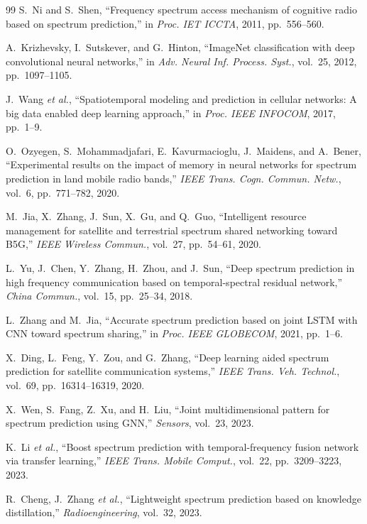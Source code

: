 \documentclass[lettersize,journal]{IEEEtran}
\begin{document}
\begin{thebibliography}{99}
 S.~Ni and S.~Shen, ``Frequency spectrum access mechanism of cognitive radio based on spectrum prediction,'' in \emph{Proc. IET ICCTA}, 2011, pp.~556--560.

 A.~Krizhevsky, I.~Sutskever, and G.~Hinton, ``ImageNet classification with deep convolutional neural networks,'' in \emph{Adv. Neural Inf. Process. Syst.}, vol.~25, 2012, pp.~1097--1105.

 J.~Wang \emph{et al.}, ``Spatiotemporal modeling and prediction in cellular networks: A big data enabled deep learning approach,'' in \emph{Proc. IEEE INFOCOM}, 2017, pp.~1--9.

 O.~Ozyegen, S.~Mohammadjafari, E.~Kavurmacioglu, J.~Maidens, and A.~Bener, ``Experimental results on the impact of memory in neural networks for spectrum prediction in land mobile radio bands,'' \emph{IEEE Trans. Cogn. Commun. Netw.}, vol.~6, pp.~771--782, 2020.

 M.~Jia, X.~Zhang, J.~Sun, X.~Gu, and Q.~Guo, ``Intelligent resource management for satellite and terrestrial spectrum shared networking toward B5G,'' \emph{IEEE Wireless Commun.}, vol.~27, pp.~54--61, 2020.

 L.~Yu, J.~Chen, Y.~Zhang, H.~Zhou, and J.~Sun, ``Deep spectrum prediction in high frequency communication based on temporal-spectral residual network,'' \emph{China Commun.}, vol.~15, pp.~25--34, 2018.

 L.~Zhang and M.~Jia, ``Accurate spectrum prediction based on joint LSTM with CNN toward spectrum sharing,'' in \emph{Proc. IEEE GLOBECOM}, 2021, pp.~1--6.

 X.~Ding, L.~Feng, Y.~Zou, and G.~Zhang, ``Deep learning aided spectrum prediction for satellite communication systems,'' \emph{IEEE Trans. Veh. Technol.}, vol.~69, pp.~16314--16319, 2020.

 X.~Wen, S.~Fang, Z.~Xu, and H.~Liu, ``Joint multidimensional pattern for spectrum prediction using GNN,'' \emph{Sensors}, vol.~23, 2023.

 K.~Li \emph{et al.}, ``Boost spectrum prediction with temporal-frequency fusion network via transfer learning,'' \emph{IEEE Trans. Mobile Comput.}, vol.~22, pp.~3209--3223, 2023.

 R.~Cheng, J.~Zhang \emph{et al.}, ``Lightweight spectrum prediction based on knowledge distillation,'' \emph{Radioengineering}, vol.~32, 2023.


\end{thebibliography}
\end{document}
